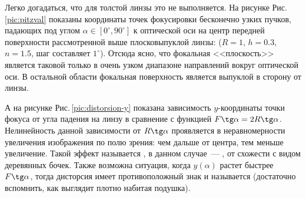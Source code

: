 Легко догадаться, что для толстой линзы это не выполняется. На рисунке Рис.\,\ref{pic:pitzval} показаны координаты точек фокусировки бесконечно узких пучков, падающих под углом $\alpha \in [0^\circ, 90^\circ]$ к оптической оси на центр передней поверхности рассмотренной выше плосковыпуклой линзы: ($R = 1$, $h = 0.3$, $n=1.5$, шаг составляет $1^\circ$). Отсюда ясно, что фокальная <<плоскость>> является таковой только в очень узком диапазоне направлений вокруг оптической оси. В остальной области фокальная поверхность является выпуклой в сторону от линзы.

  А на рисунке Рис.\,\ref{pic:distorsion-y} показана зависимость $y$-координаты точки фокуса от угла падения на линзу в сравнение с функцией $F \tg \alpha = 2R \tg \alpha$. Нелинейность данной зависимости от $R \tg \alpha$ проявляется в неравномерности увеличения изображения по полю зрения: чем дальше от центра, тем меньше увеличение. Такой эффект называется , в данном случае~--- , от схожести с видом деревянных бочек. Также возможна ситуация, когда $y(\alpha)$ растет быстрее $F \tg \alpha$, тогда дисторсия имеет противоположный знак и называется  (достаточно вспомнить, как выглядит плотно набитая подушка).
  

